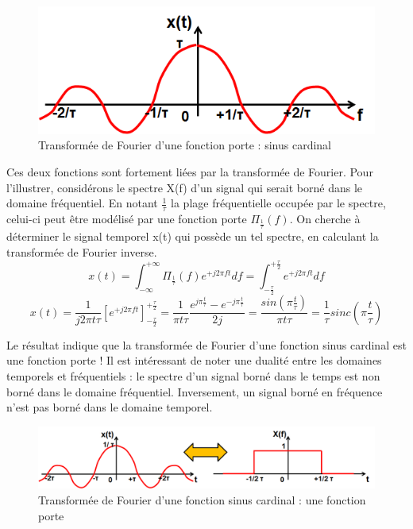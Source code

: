 	\begin{figure}[h!]
		\centering
		\includegraphics[scale=0.5]{images/sinc_freq.png}
		\caption{Transformée de Fourier d'une fonction porte : sinus cardinal}	
		\label{Fig:sinc_freq} 
	\end{figure}

	Ces deux fonctions sont fortement liées par la transformée de Fourier. Pour l'illustrer, considérons le spectre X(f) d'un signal qui serait borné dans le domaine fréquentiel. En notant $\frac{1}{\tau}$ la plage fréquentielle occupée par le spectre, celui-ci peut être modélisé par une fonction porte $\Pi_{\frac{1}{\tau}}(f)$. On cherche à déterminer le signal temporel x(t) qui possède un tel spectre, en calculant la transformée de Fourier inverse.
	\begin{equation*}
	x(t)=\int_{-\infty}^{+\infty}\Pi_{\frac{1}{\tau}}(f)e^{+j2\pi ft}df=\int_{-\frac{\tau}{2}}^{+\frac{\tau}{2}}e^{+j2\pi ft}df
	\end{equation*}
	\begin{equation*}
	x(t)=\frac{1}{j2\pi t \tau}[e^{+j2\pi ft}]_{-\frac{\tau}{2}}^{+\frac{\tau}{2}}=\frac{1}{\pi t \tau}\frac{e^{j\pi\frac{t}{\tau}}-e^{-j\pi\frac{t}{\tau}}}{2j}=\frac{sin(\pi\frac{t}{\tau})}{\pi t \tau}=\frac{1}{\tau}sinc(\pi\frac{t}{\tau})
	\end{equation*}
	
	Le résultat indique que la transformée de Fourier d'une fonction sinus cardinal est une fonction porte ! Il est intéressant de noter une dualité entre les domaines temporels et fréquentiels : le spectre d'un signal borné dans le temps est non borné dans le domaine fréquentiel. Inversement, un signal borné en fréquence n'est pas borné dans le domaine temporel. 
	
	\begin{figure}[h!]
			\centering
			\includegraphics[scale=0.5]{images/TF_sinc.png}
			\caption{Transformée de Fourier d'une fonction sinus cardinal : une fonction porte}	
			\label{Fig:TF_sinc} 
	\end{figure}
	
